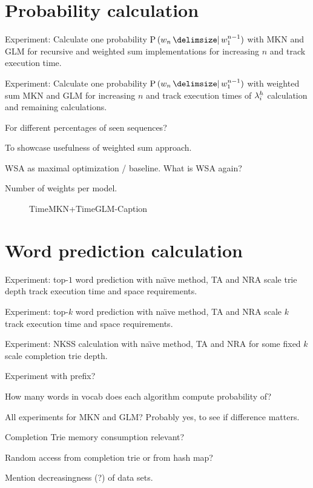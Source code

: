 \section{Probability calculation}
\label{sec:evaluation-probability}

\begin{draft}
Experiment: Calculate one probability $\Prob{w_n}{w_1^{n-1}}$ with MKN and GLM
for recursive and weighted sum implementations for increasing $n$ and track
execution time.

Experiment: Calculate one probability $\Prob{w_n}{w_1^{n-1}}$ with weighted sum
MKN and GLM for increasing $n$ and track execution times of $\lambda^h_i$
calculation and remaining calculations.

For different percentages of seen sequences?

To showcase usefulness of weighted sum approach.

WSA as maximal optimization / baseline.
What is WSA again?

Number of weights per model.
\end{draft}

\begin{figure}
  \hspace{-5em}
  \centering
  \begin{subfigure}{.45\textwidth}
    
  \end{subfigure}
  \hspace{4em}
  \begin{subfigure}{.45\textwidth}
    
  \end{subfigure}
  \caption{TimeMKN+TimeGLM-Caption}
\end{figure}

\section{Word prediction calculation}

\begin{draft}
Experiment: top-$1$ word prediction with na\"{\i}ve method, TA and NRA scale
trie depth track execution time and space requirements.

Experiment: top-$k$ word prediction with na\"{\i}ve method, TA and NRA scale
$k$ track execution time and space requirements.

Experiment: NKSS calculation with na\"{\i}ve method, TA and NRA for some fixed
$k$ scale completion trie depth.

Experiment with prefix?

How many words in vocab does each algorithm compute probability of?

All experiments for MKN and GLM?
Probably yes, to see if difference matters.

Completion Trie memory consumption relevant?

Random access from completion trie or from hash map?

Mention decreasingness (?) of data sets.
\end{draft}

